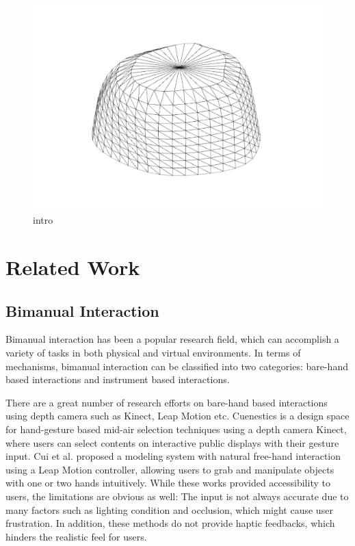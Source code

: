 \begin{figure}
  \includegraphics[width=\textwidth]{fig1.pdf}
\caption{intro}
\label{fig:1}       %
\end{figure}


\section{Related Work}
\label{sec:2}

\subsection{Bimanual Interaction}
\label{sec:2.1}
Bimanual interaction has been a popular research field, which can accomplish a variety of tasks in both physical and virtual environments.
In terms of mechanisms, bimanual interaction can be classified into two categories: bare-hand based interactions and instrument based interactions.

There are a great number of research efforts \cite{walter2014cuenesics,cui2016exploration,ramani2015gesture,murugappan2013handy,han2014virtual} on bare-hand based interactions using depth camera such as Kinect, Leap Motion etc.
Cuenestics \cite{walter2014cuenesics} is a design space for hand-gesture based mid-air selection techniques using a depth camera Kinect, where users can select contents on interactive public displays with their gesture input.
Cui et al. \cite{cui2016exploration} proposed a modeling system with natural free-hand interaction using a Leap Motion controller, allowing users to grab and manipulate objects with one or two hands intuitively.
While these works provided accessibility to users, the limitations are obvious as well: The input is not always accurate due to many factors such as lighting condition and occlusion, which might cause user frustration.
In addition, these methods do not provide haptic feedbacks, which hinders the realistic feel for users.

